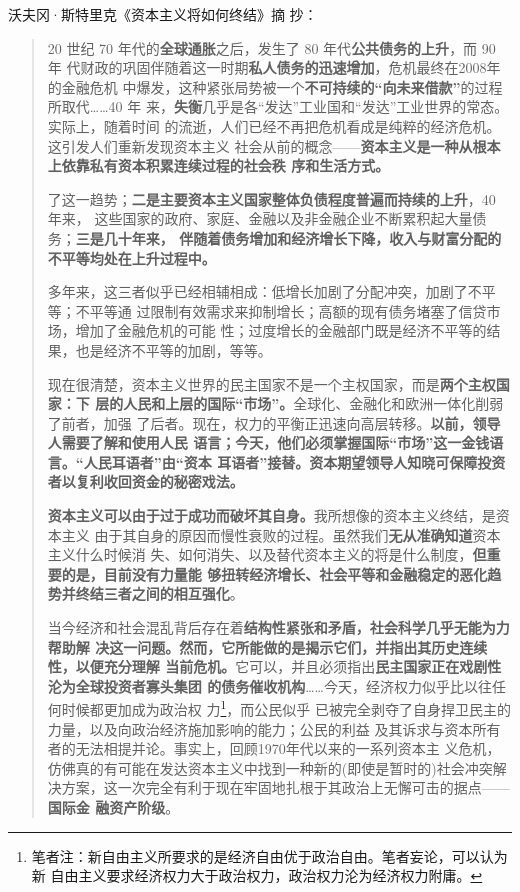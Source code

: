 沃夫冈·斯特里克《资本主义将如何终结》\cite{JJDK201504024}\cite{streeck2017will}摘
抄：
\begin{quotation}
  20 世纪 70 年代的\textbf{全球通胀}之后，发生了 80 年代\textbf{公共债务的上升}，而 90 年
  代财政的巩固伴随着这一时期\textbf{私人债务的迅速增加}，危机最终在2008年的金融危机
  中爆发，这种紧张局势被一个\textbf{不可持续的“向未来借款”}的过程所取代……40 年
  来，\textbf{失衡}几乎是各“发达”工业国和“发达”工业世界的常态。实际上，随着时间
  的流逝，人们已经不再把危机看成是纯粹的经济危机。这引发人们重新发现资本主义
  社会从前的概念——\textbf{资本主义是一种从根本上依靠私有资本积累连续过程的社会秩
    序和生活方式。}

  了这一趋势；\textbf{二是主要资本主义国家整体负债程度普遍而持续的上升}，40 年来，
  这些国家的政府、家庭、金融以及非金融企业不断累积起大量债务；\textbf{三是几十年来，
    伴随着债务增加和经济增长下降，收入与财富分配的不平等均处在上升过程中。}

  多年来，这三者似乎已经相辅相成：低增长加剧了分配冲突，加剧了不平等；不平等通
  过限制有效需求来抑制增长；高额的现有债务堵塞了信贷市场，增加了金融危机的可能
  性；过度增长的金融部门既是经济不平等的结果，也是经济不平等的加剧，等等。

  现在很清楚，资本主义世界的民主国家不是一个主权国家，而是\textbf{两个主权国家：下
    层的人民和上层的国际“市场”。}全球化、金融化和欧洲一体化削弱了前者，加强
  了后者。现在，权力的平衡正迅速向高层转移。\textbf{以前，领导人需要了解和使用人民
    语言；今天，他们必须掌握国际“市场”这一金钱语言。“人民耳语者”由“资本
    耳语者”接替。资本期望领导人知晓可保障投资者以复利收回资金的秘密戏法。}

  \textbf{资本主义可以由于过于成功而破坏其自身。}我所想像的资本主义终结，是资本主义
  由于其自身的原因而慢性衰败的过程。虽然我们\textbf{无从准确知道}资本主义什么时候消
  失、如何消失、以及替代资本主义的将是什么制度，\textbf{但重要的是，目前没有力量能
    够扭转经济增长、社会平等和金融稳定的恶化趋势并终结三者之间的相互强化}。

  当今经济和社会混乱背后存在着\textbf{结构性紧张和矛盾，社会科学几乎无能为力帮助解
    决这一问题。然而，它所能做的是揭示它们，并指出其历史连续性，以便充分理解
    当前危机。}它可以，并且必须指出\textbf{民主国家正在戏剧性沦为全球投资者寡头集团
    的债务催收机构}……今天，经济权力似乎比以往任何时候都更加成为政治权
  力\footnote{笔者注：新自由主义所要求的是经济自由优于政治自由。笔者妄论，可以认为新
    自由主义要求经济权力大于政治权力，政治权力沦为经济权力附庸。}，而公民似乎
  已被完全剥夺了自身捍卫民主的力量，以及向政治经济施加影响的能力；公民的利益
  及其诉求与资本所有者的无法相提并论。事实上，回顾1970年代以来的一系列资本主
  义危机，仿佛真的有可能在发达资本主义中找到一种新的(即使是暂时的)社会冲突解
  决方案，这一次完全有利于现在牢固地扎根于其政治上无懈可击的据点——\textbf{国际金
    融资产阶级}。


\end{quotation}
